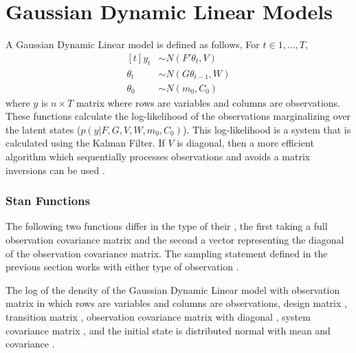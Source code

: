 \section{Gaussian Dynamic Linear Models}
\label{sec:guass-dynam-line}

A Gaussian Dynamic Linear model is defined as follows,
For $t \in 1, \dots, T$,
\[
  \begin{aligned}[t]
    y_{t} &\sim N(F' \theta_{t}, V) \\
    \theta_{t} &\sim N(G \theta_{t - 1}, W) \\
    \theta_{0} &\sim N(m_{0}, C_{0}) 
  \end{aligned}
\]
where $y$ is $n \times T$ matrix where rows are variables and columns
are observations. These functions calculate the log-likelihood of the
observations marginalizing over the latent states ($p(y | F, G, V, W,
m_{0}, C_{0})$). This log-likelihood is a system that is calculated using
the Kalman Filter. If $V$ is diagonal, then a more efficient
algorithm which sequentially processes observations and avoids a
matrix inversions can be used \citep[Sec~6.4]{DurbinKoopman:2001}.


\subsubsection{Stan Functions}

The following two functions differ in the type of their , the
first taking a full observation covariance matrix  and the
second a vector  representing the diagonal of the observation
covariance matrix.  The sampling statement defined in the previous
section works with either type of observation .

\begin{description}
%
% 
%
 {The log of the density of the Gaussian Dynamic
  Linear model with observation matrix  in which rows are
  variables and columns are observations, design matrix ,
  transition matrix , observation covariance matrix with
  diagonal , system covariance matrix , and the
  initial state is distributed normal with mean  and
  covariance .}
%
\end{description}


